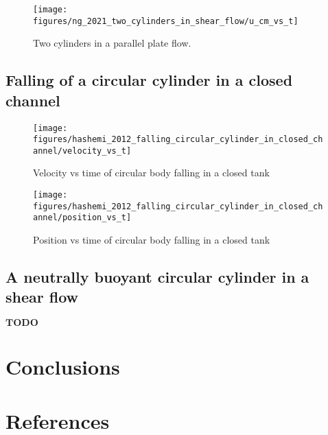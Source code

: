 \documentclass[preprint,12pt]{elsarticle}
\newcommand{\ten}[1]{\ensuremath{\mathbf{#1}}}
\begin{document}
\citet{ng_numerical_2021}

\begin{figure}[!htpb]
  \centering
  \texttt{[image: figures/ng\_2021\_two\_cylinders\_in\_shear\_flow/u\_cm\_vs\_t]}
  \caption{Two cylinders in a parallel plate flow.}
\label{fig:xxx}
\end{figure}


\FloatBarrier%
\subsection{Falling of a circular cylinder in a closed channel}
\label{sec:res:hpf}


\citet{hashemi_modified_2012}

\begin{figure}[!htpb]
  \centering
  \texttt{[image: figures/hashemi\_2012\_falling\_circular\_cylinder\_in\_closed\_channel/velocity\_vs\_t]}
  \caption{Velocity vs time of circular body falling in a closed tank}
\label{fig:xxxx}
\end{figure}

\begin{figure}[!htpb]
  \centering
  \texttt{[image: figures/hashemi\_2012\_falling\_circular\_cylinder\_in\_closed\_channel/position\_vs\_t]}
  \caption{Position vs time of circular body falling in a closed tank}
\label{fig:xxxx}
\end{figure}


\FloatBarrier%
\subsection{A neutrally buoyant circular cylinder in a shear ﬂow}
\label{sec:res:hpf}
\citet{hashemi_modified_2012}

\ten{TODO}



\FloatBarrier%
\section{Conclusions}
\label{sec:conclusions}


\section*{References}




\end{document}
